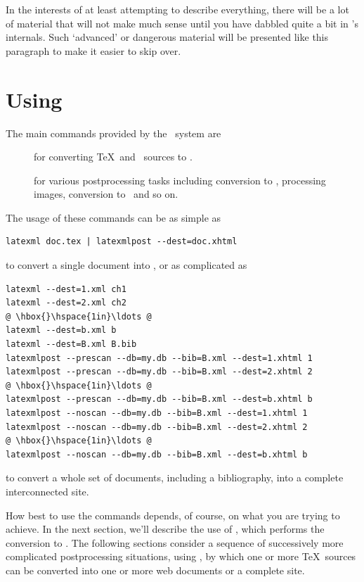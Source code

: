 \documentclass{book}
\begin{document}
\begin{advanced}
In the interests of at least attempting to describe everything,
there will be a lot of material that will not make much sense until
you have dabbled quite a bit in \LaTeXML's internals.
Such `advanced' or dangerous material will be presented like this paragraph
to make it easier to skip over.
\end{advanced}

\chapter{Using \LaTeXML}\label{usage}
The main commands provided by the \LaTeXML\ system are
\begin{description}
\item[] for converting \TeX\ and \BibTeX\ sources to \XML.
\item[] for various postprocessing tasks including
conversion to \HTML, processing images, conversion to \MathML\ and so on.
\end{description}
\noindent The usage of these commands can be as simple as
\begin{lstlisting}[style=shell]
latexml doc.tex | latexmlpost --dest=doc.xhtml
\end{lstlisting}
\noindent to convert a single document into \XHTML,  or as complicated as
\begin{lstlisting}[style=shell]
latexml --dest=1.xml ch1
latexml --dest=2.xml ch2
@ \hbox{}\hspace{1in}\ldots @
latexml --dest=b.xml b
latexml --dest=B.xml B.bib
latexmlpost --prescan --db=my.db --bib=B.xml --dest=1.xhtml 1
latexmlpost --prescan --db=my.db --bib=B.xml --dest=2.xhtml 2
@ \hbox{}\hspace{1in}\ldots @
latexmlpost --prescan --db=my.db --bib=B.xml --dest=b.xhtml b
latexmlpost --noscan --db=my.db --bib=B.xml --dest=1.xhtml 1
latexmlpost --noscan --db=my.db --bib=B.xml --dest=2.xhtml 2
@ \hbox{}\hspace{1in}\ldots @
latexmlpost --noscan --db=my.db --bib=B.xml --dest=b.xhtml b
\end{lstlisting}
\noindent to convert a whole set of documents, including a bibliography,
into a complete interconnected site.

How best to use the commands depends, of course, on what you
are trying to achieve.  In the next section, we'll describe
the use of , which performs the conversion to \XML.
The following sections consider a sequence of
successively more complicated postprocessing situations,
using ,
by which one or more \TeX\ sources can be converted into
one or more web documents or a complete site.
\end{document}

